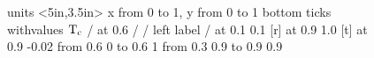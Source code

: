 \headheight 8pt



\pagestyle{empty}

\begin{figure}
\label{tcdef}
\beginpicture
\setcoordinatesystem units <5in,3.5in>
\setplotarea x from 0 to 1, y from 0 to 1
\axis bottom ticks withvalues $\rm T_c$ / at 0.6 / /
\axis left label {} /
 at  0.1 0.1
 [r] at 0.9 1.0
 [t] at 0.9 -0.02
\linethickness=1pt
\setdashes
\putrule from 0.6 0 to 0.6 1
\putrule from 0.3 0.9 to 0.9 0.9
\setsolid
\endpicture
\caption[]{}
\end{figure}

